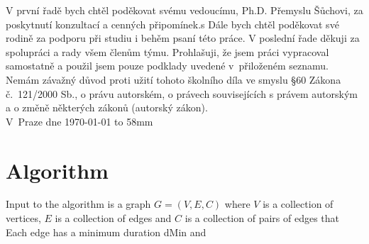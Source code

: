 \documentclass[11pt,twoside,a4paper]{book}
\author{Jan Dryk}
\begin{document}
%
\cleardoublepage

\maketitle
\cleardoublepage

{%
	V první řadě bych chtěl poděkovat svému vedoucímu, Ph.D. Přemyslu Šůchovi, za poskytnutí konzultací a cenných připomínek.s
	Dále bych chtěl poděkovat své rodině za podporu při studiu i behěm psaní této práce.
	V poslední řade děkuji za spolupráci a rady všem členům týmu.
}
{%
	Prohlašuji, že jsem práci vypracoval samostatně a použil jsem pouze podklady uvedené v~přiloženém seznamu.\\
	Nemám závažný důvod proti užití tohoto školního díla ve smyslu \S 60 Zákona č.~121/2000 Sb., o právu autorském, o právech souvisejících s právem autorským a o změně některých zákonů (autorský zákon).
\\[15mm]
	V~Praze dne \today \vspace{10mm} \hfill \hbox to 58mm{\tiny\dotfill}
}

\cleardoublepage


{
    
}
{
    
}

\setcounter{page}{1}

\tableofcontents




\section{Algorithm}
Input to the algorithm is a graph $G=(V, E, C)$ where $V$ is a collection of vertices, $E$ is a collection of edges and $C$ is a collection of pairs of edges that 
Each edge has a minimum duration dMin and 
\end{document}
